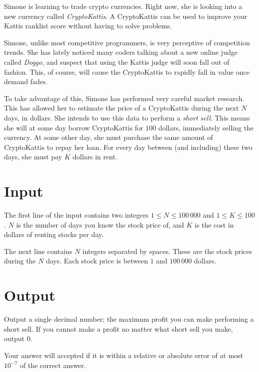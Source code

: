 Simone is learning to trade crypto currencies.
Right now, she is looking into a new currency called \emph{CryptoKattis}.
A CryptoKattis can be used to improve your Kattis ranklist score without having to solve problems.

Simone, unlike most competitive programmers, is very perceptive of competition trends.
She has lately noticed many coders talking about a new online judge called \emph{Doggo}, and suspect that using the Kattis judge will soon fall out of fashion.
This, of course, will cause the CryptoKattis to rapidly fall in value once demand fades.

To take advantage of this, Simone has performed very careful market research.
This has allowed her to estimate the price of a CryptoKattis during the next $N$ days, in dollars.
She intends to use this data to perform a \emph{short sell}.
This means she will at some day borrow CryptoKattis for $100$ dollars, immediately selling the currency.
At some other day, she must purchase the same amount of CryptoKattis to repay her loan.
For every day between (and including) these two days, she must pay $K$ dollars in rent.

\section*{Input}
The first line of the input contains two integers $1 \le N \le 100\,000$ and $1 \le K \le 100$.
$N$ is the number of days you know the stock price of, and $K$ is the cost in dollars of renting stocks per day.

The next line contains $N$ integers separated by spaces.
These are the stock prices during the $N$ days.
Each stock price is between $1$ and $100\,000$ dollars.

\section*{Output}
Output a single decimal number; the maximum profit you can make performing a short sell.
If you cannot make a profit no matter what short sell you make, output $0$.

Your answer will accepted if it is within a relative or absolute error of at most $10^{-7}$ of the correct answer.
